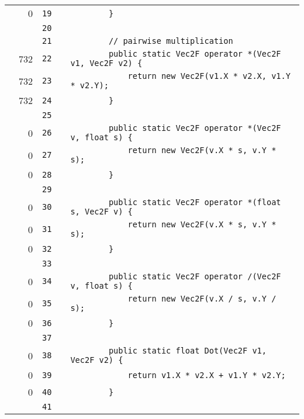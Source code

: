 \documentclass[a4paper,landscape,10pt]{article}
\begin{document}
\begin{longtable}[l]{lrrll}
\cellcolor{red} & 0 & \verb~19~ & & \verb~        }~\\
\cellcolor{gray} &  & \verb~20~ & & \verb~~\\
\cellcolor{gray} &  & \verb~21~ & & \verb~        // pairwise multiplication~\\
\cellcolor{green} & 732 & \verb~22~ & & \verb~        public static Vec2F operator *(Vec2F v1, Vec2F v2) {~\\
\cellcolor{green} & 732 & \verb~23~ & & \verb~            return new Vec2F(v1.X * v2.X, v1.Y * v2.Y);~\\
\cellcolor{green} & 732 & \verb~24~ & & \verb~        }~\\
\cellcolor{gray} &  & \verb~25~ & & \verb~~\\
\cellcolor{red} & 0 & \verb~26~ & & \verb~        public static Vec2F operator *(Vec2F v, float s) {~\\
\cellcolor{red} & 0 & \verb~27~ & & \verb~            return new Vec2F(v.X * s, v.Y * s);~\\
\cellcolor{red} & 0 & \verb~28~ & & \verb~        }~\\
\cellcolor{gray} &  & \verb~29~ & & \verb~~\\
\cellcolor{red} & 0 & \verb~30~ & & \verb~        public static Vec2F operator *(float s, Vec2F v) {~\\
\cellcolor{red} & 0 & \verb~31~ & & \verb~            return new Vec2F(v.X * s, v.Y * s);~\\
\cellcolor{red} & 0 & \verb~32~ & & \verb~        }~\\
\cellcolor{gray} &  & \verb~33~ & & \verb~~\\
\cellcolor{red} & 0 & \verb~34~ & & \verb~        public static Vec2F operator /(Vec2F v, float s) {~\\
\cellcolor{red} & 0 & \verb~35~ & & \verb~            return new Vec2F(v.X / s, v.Y / s);~\\
\cellcolor{red} & 0 & \verb~36~ & & \verb~        }~\\
\cellcolor{gray} &  & \verb~37~ & & \verb~~\\
\cellcolor{red} & 0 & \verb~38~ & & \verb~        public static float Dot(Vec2F v1, Vec2F v2) {~\\
\cellcolor{red} & 0 & \verb~39~ & & \verb~            return v1.X * v2.X + v1.Y * v2.Y;~\\
\cellcolor{red} & 0 & \verb~40~ & & \verb~        }~\\
\cellcolor{gray} &  & \verb~41~ & & \verb~~\\

\end{longtable}
\end{document}
